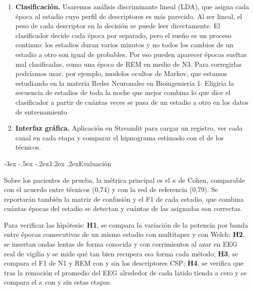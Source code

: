 \documentclass[11pt,a4paper]{article}
\makeatletter
\renewcommand\section{\@startsection{section}{1}{\z@}%
  {-3ex \@plus -.5ex \@minus -.2ex}{1.2ex \@plus .2ex}{\normalfont\large\bfseries}}
\makeatother
\begin{document}
\begin{enumerate}[label=\textbf{\arabic*.}, leftmargin=1.6em, itemsep=6pt, topsep=4pt]
\item \textbf{Clasificación.} Usaremos análisis discriminante lineal
  (LDA), que asigna cada época al estadio cuyo perfil de descriptores es
  más parecido. Al ser lineal, el peso de cada descriptor en la decisión
  se puede leer directamente. El clasificador decide cada época por
  separado, pero el sueño es un proceso continuo: los estadios duran
  varios minutos y no todos los cambios de un estadio a otro son igual de
  probables. Por eso pueden aparecer épocas sueltas mal clasificadas, como
  una época de REM en medio de N3. Para corregirlas podríamos usar, por
  ejemplo, modelos ocultos de Markov, que estamos
  estudiando en la materia Redes Neuronales en Bioingeniería 1. Eligiría la secuencia de estadios de toda la noche que
  mejor combina lo que dice el clasificador a partir
  de cuántas veces se pasa de un estadio a otro en los datos de entrenamiento

\item \textbf{Interfaz gráfica.} Aplicación en Streamlit para cargar un
  registro, ver cada canal en cada etapa y comparar el hipnograma
  estimado con el de los técnicos.
\end{enumerate}

\section{Evaluación}

Sobre los pacientes de prueba, la métrica principal es el $\kappa$ de
Cohen, comparable con el acuerdo entre técnicos (0,74) y con la red de
referencia (0,79). Se reportarán también la matriz de confusión y el F1 de cada estadio,
que combina cuántas épocas del estadio se detectan y cuántas de las
asignadas son correctas.

Para verificar las hipótesis: \textbf{H1}, se
compara la variación de la potencia por banda entre épocas consecutivas
de un mismo estadio con multitaper y con Welch; \textbf{H2}, se insertan
ondas lentas de forma conocida y con corrimientos al azar en EEG real de
vigilia y se mide qué tan bien recupera esa forma cada método;
\textbf{H3}, se compara el F1 de N1 y REM con y sin los descriptores
CSP; \textbf{H4}, se verifica que tras la remoción el promedio del EEG
alrededor de cada latido tienda a cero y se compara el $\kappa$ con y
sin estas etapas.

\end{document}
